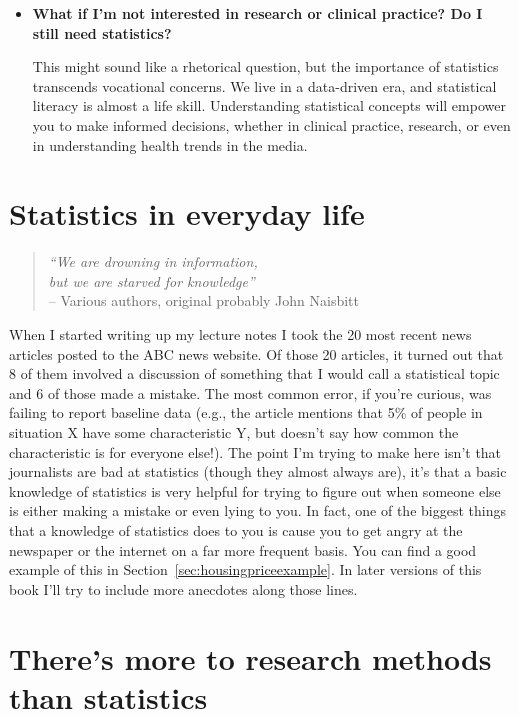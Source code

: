 \begin{itemize}
\item {\bf What if I'm not interested in research or clinical practice? Do I still need statistics?}

This might sound like a rhetorical question, but the importance of statistics transcends vocational concerns. We live in a data-driven era, and statistical literacy is almost a life skill. Understanding statistical concepts will empower you to make informed decisions, whether in clinical practice, research, or even in understanding health trends in the media.

\end{itemize}


\section{Statistics in everyday life}

\begin{quote}
{\it ``We are drowning in information,\\ but we are starved for knowledge''} \\ \hspace*{2cm} -- Various authors, original probably John Naisbitt
\end{quote}

\noindent
When I started writing up my lecture notes I took the 20 most recent news articles posted to the ABC news website. Of those 20 articles, it turned out that 8 of them involved a discussion of something that I would call a statistical topic and 6 of those made a mistake. The most common error, if you're curious, was failing to report baseline data (e.g., the article mentions that 5\% of people in situation X have some characteristic Y, but doesn't say how common the characteristic is for everyone else!). The point I'm trying to make here isn't that journalists are bad at statistics (though they almost always are), it's that a  basic knowledge of statistics is very helpful for trying to figure out when someone else is either making a mistake or even lying to you. In fact, one of the biggest things that a knowledge of statistics does to you is cause you to get angry at the newspaper or the internet on a far more frequent basis. You can find a good example of this in Section~\ref{sec:housingpriceexample}. In later versions of this book I'll try to include more anecdotes along those lines. 


\section{There's more to research methods than statistics}

